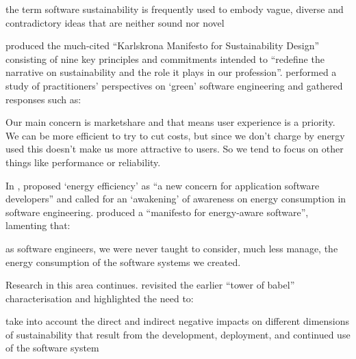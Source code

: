 \begin{displayquote}
the term software sustainability is frequently used to embody vague, diverse and contradictory ideas that are neither sound nor novel \citep[p. 5]{Venters2014}\end{displayquote}

\citet{Becker2015} produced the much-cited \enquote{Karlskrona Manifesto for Sustainability Design} consisting of nine key principles and commitments intended to \enquote{redefine the narrative on sustainability and the role it plays in our profession}.
\citet{Manotas2016} performed a study of practitioners' perspectives on `green' software engineering and gathered responses such as:

\begin{displayquote}
Our main concern is marketshare and that means user experience is a priority. We can be more efficient to try to cut costs, but since we don’t charge by energy used this doesn’t make us more attractive to users. So we tend to focus on other things like performance or reliability. \citep[p.241]{Manotas2016}
\end{displayquote}

In \citeyear{Pinto2017a}, \citeauthor{Pinto2017a} proposed `energy efficiency' as \enquote{a new concern for application software developers} and \citet{Jagroep2017} called for an `awakening' of awareness on energy consumption in software engineering. \citet{Fonseca2019} produced a \enquote{manifesto for energy-aware software}, lamenting that:

\begin{displayquote}
as software engineers, we were never taught to consider, much less manage, the energy consumption of the software systems we created. \citep[p.79]{Fonseca2019}
\end{displayquote}

Research in this area continues. \citet{Venters2021} revisited the earlier \enquote{tower of babel} characterisation and highlighted the need to:
\begin{displayquote}
take into account the direct and indirect negative impacts on different dimensions of sustainability that result from the development, deployment, and continued use of the software system \citep[p. 2]{Venters2021}
\end{displayquote}

